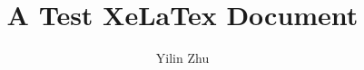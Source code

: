 \documentclass[a4paper, 12pt, titlepage]{article}
\begin{document}
\setlength{\parindent}{2em}

\title{A Test XeLaTex Document}
\author{Yilin Zhu}
\maketitle

\tableofcontents
\listoffigures
\listoftables
\end{document}
